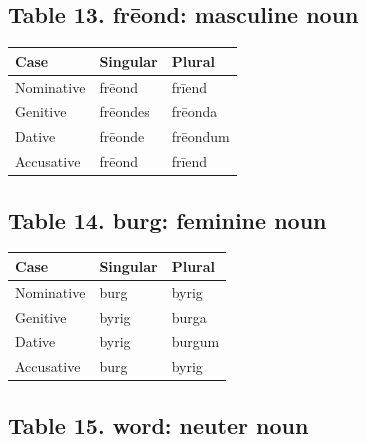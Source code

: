\subsection*{Table 13. frēond: masculine noun}

\par\begingroup
\fontsize{10.5}{13.2}\selectfont
\setlength{\LTleft}{0pt}\setlength{\LTright}{\fill}
\noindent
\begin{tabular}{@{}>{\raggedright\arraybackslash}p{39.46mm}>{\raggedright\arraybackslash}p{39.46mm}>{\raggedright\arraybackslash}p{39.46mm}@{}}
\toprule
\textbf{Case} & \textbf{Singular} & \textbf{Plural} \\
\midrule
Nominative & frēond & frīend \\
Genitive & frēondes & frēonda \\
Dative & frēonde & frēondum \\
Accusative & frēond & frīend \\
\bottomrule
\end{tabular}
\par\endgroup

\subsection*{Table 14. burg: feminine noun}

\par\begingroup
\fontsize{10.5}{13.2}\selectfont
\setlength{\LTleft}{0pt}\setlength{\LTright}{\fill}
\noindent
\begin{tabular}{@{}>{\raggedright\arraybackslash}p{39.46mm}>{\raggedright\arraybackslash}p{39.46mm}>{\raggedright\arraybackslash}p{39.46mm}@{}}
\toprule
\textbf{Case} & \textbf{Singular} & \textbf{Plural} \\
\midrule
Nominative & burg & byrig \\
Genitive & byrig & burga \\
Dative & byrig & burgum \\
Accusative & burg & byrig \\
\bottomrule
\end{tabular}
\par\endgroup

\subsection*{Table 15. word: neuter noun}

